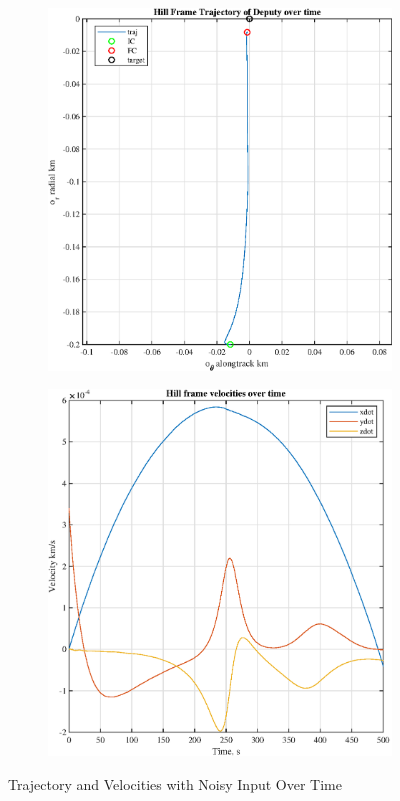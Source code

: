 \documentclass[conf]{new-aiaa}
\begin{document}
\begin{singlespace}
\begin{figure}[htpb!]
\begin{subfigure}{.5\textwidth}
  \centering
  \includegraphics[width=.8\linewidth]{figures/traj_noise.eps}
\end{subfigure}%
\begin{subfigure}{.5\textwidth}
  \centering
  \includegraphics[width=.8\linewidth]{figures/vels_noise.eps}
\end{subfigure}
\caption{Trajectory and Velocities with Noisy Input Over Time}

\end{figure}
\end{singlespace}
\end{document}
